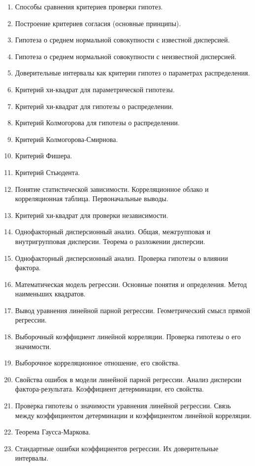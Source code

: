 \documentclass[12pt]{article}
\begin{document}
\begin{enumerate}
    \item Способы сравнения критериев проверки гипотез.
    \item Построение критериев согласия (основные принципы).
    \item Гипотеза о среднем нормальной совокупности с известной дисперсией.
    \item Гипотеза о среднем нормальной совокупности с неизвестной дисперсией.
    \item Доверительные интервалы как критерии гипотез о параметрах распределения.
    \item Критерий хи-квадрат для параметрической гипотезы.
    \item Критерий хи-квадрат для гипотезы о распределении.
    \item Критерий Колмогорова для гипотезы о распределении.
    \item Критерий Колмогорова-Смирнова.
    \item Критерий Фишера.
    \item Критерий Стьюдента.
    \item Понятие статистической зависимости. Корреляционное облако и корреляционная таблица. Первоначальные выводы.
    \item Критерий хи-квадрат для проверки независимости.
    \item Однофакторный дисперсионный анализ. Общая, межгрупповая и внутригрупповая дисперсии. Теорема о разложении дисперсии.
    \item Однофакторный дисперсионный анализ. Проверка гипотезы о влиянии фактора.
    \item Математическая модель регрессии. Основные понятия и определения. Метод наименьших квадратов.
    \item Вывод уравнения линейной парной регрессии. Геометрический смысл прямой регрессии.
    \item Выборочный коэффициент линейной корреляции. Проверка гипотезы о его значимости.
    \item Выборочное корреляционное отношение, его свойства.
    \item Свойства ошибок в модели линейной парной регрессии. Анализ дисперсии фактора-результата. Коэффициент детерминации, его свойства.
    \item Проверка гипотезы о значимости уравнения линейной регрессии. Связь между коэффициентом детерминации и коэффициентом линейной корреляции.
    \item Теорема Гаусса-Маркова.
    \item Стандартные ошибки коэффициентов регрессии. Их доверительные интервалы.

\end{enumerate}
\end{document}

